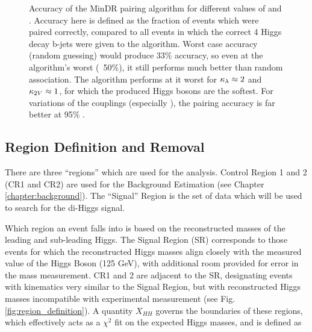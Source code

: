         \begin{figure}[hbt]
            \centering
            \caption{Accuracy of the MinDR pairing algorithm for different values of \kv and \kvv.
                Accuracy here is defined as the fraction of events which were paired correctly,
                compared to all events in which the correct 4 Higgs decay b-jets were given to the algorithm.
                Worst case accuracy (random guessing) would produce 33\% accuracy,
                    so even at the algorithm's worst (~50\%),
                    it still performs much better than random association.
                The algorithm performs at it worst for $\kappa_{\lambda} \approx 2$ and $\kappa_{2V} \approx 1$,
                    for which the produced Higgs bosons are the softest.
                For variations of the couplings (especially \kvv),
                    the pairing accuracy is far better at 95\% \cite{hh4b_2021_int_note}.
                }
            \label{fig:HHpairing}
        \end{figure}
                                                                                                         


    \FloatBarrier
    \subsection{ Region Definition and \ttbar Removal}
        
        There are three ``regions'' which are used for the analysis.
        Control Region 1 and 2 (CR1 and CR2) are used for the Background Estimation (see Chapter \ref{chapter:background}).
        The ``Signal'' Region is the set of data which will be used to search for the di-Higgs signal.

        Which region an event falls into is based on the reconstructed masses of the leading and sub-leading Higgs.
        The Signal Region (SR) corresponds to those events for which the reconstructed Higgs masses
            align closely with the measured value of the Higgs Boson (125 GeV),
            with additional room provided for error in the mass measurement.
        CR1 and 2 are adjacent to the SR, designating events with kinematics very similar to the Signal Region,
            but with reconstructed Higgs masses incompatible with experimental measurement (see Fig. \ref{fig:region_definition}).
        A quantity $X_{HH}$ governs the boundaries of these regions,
            which effectively acts as a $\chi^2$ fit on the expected Higgs masses,
            and is defined as

